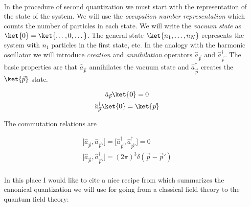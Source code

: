 \paragraph{} In the procedure of second quantization we must start with the representation of the state of the system. We
will use the \textit{occupation number representation} which counts the number of particles in each state. We
will write the \textit{vacuum state} as $\ket{0} = \ket{\dots, 0, \dots}$. The general state $\ket{n_{1}, \dots, n_{N}}$
represents the system with $n_{1}$ particles in the first state, etc. In the analogy with the harmonic oscillator we will
introduce \textit{creation} and \textit{annihilation} operators $\hat{a}_{\vec{p}}$ and $\hat{a}^{\dagger}_{\vec{p}}$.
The basic properties are that $\hat{a}_{\vec{p}}$ annihilates the vacuum state and $\hat{a}^{\dagger}_{\vec{p}}$ creates
the $\ket{\vec{p}}$ state.

\begin{equation*}
    \begin{gathered}
        \hat{a}_{\vec{p}} \ket{0} = 0 \\
        \hat{a}^{\dagger}_{\vec{p}} \ket{0} = \ket{\vec{p}}
    \end{gathered}
\end{equation*}

The commutation relations are

\begin{equation*}
    \begin{gathered}
        \big[\hat{a}_{\vec{p}}, \hat{a}_{\vec{p}'}\big] = \big[\hat{a}_{\vec{p}}^{\dagger}, \hat{a}_{\vec{p}'}^{\dagger}\big] = 0 \\
        \big[\hat{a}_{\vec{p}}, \hat{a}_{\vec{p}'}^{\dagger}\big] = (2 \pi)^{3} \delta(\vec{p} - \vec{p}')
    \end{gathered}
\end{equation*}

\paragraph{} In this place I would like to cite a nice recipe from \cite{gifted_amateur} which summarizes
the canonical quantization we will use for going from a classical field theory to the quantum 
field theory:

